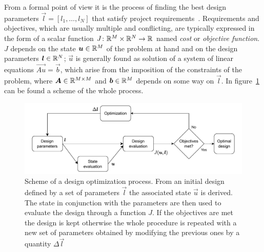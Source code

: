 From a formal point of view it is the process of finding the best design parameters $\vec{l} = [l_1, \dots, l_N]$ that satisfy project requirements~\cite{Matlab:design_opt}. Requirements and objectives, which are usually multiple and conflicting, are typically expressed in the form of a scalar function $J \colon \mathbb{R}^M\times\mathbb{R}^N \to \mathbb{R}$ named \emph{cost} or \emph{objective function}. $J$ depends on the state $\boldsymbol{u} \in \mathbb{R}^M$ of the problem at hand and on the design parameters $\boldsymbol{l} \in \mathbb{R}^N$; $\vec{u}$ is generally found as solution of a system of linear equations $\vec{Au} = \vec{b}$, which arise from the imposition of the constraints of the problem, where $\boldsymbol{A} \in \mathbb{R}^{M \times M}$ and $\boldsymbol{b} \in \mathbb{R}^M$ depends on some way on $\vec{l}$. In figure~\ref{fig:design_opt_scheme} can be found a scheme of the whole process.


\begin{figure}
	\centering
	\includegraphics[width=\textwidth]{img/design_opt_scheme.pdf}
	\caption{Scheme of a design optimization process. From an initial design defined by a set of parameters $\vec{l}$ the associated state $\vec{u}$ is derived. The state in conjunction with the parameters are then used to evaluate the design through a function $J$. If the objectives are met the design is kept otherwise the whole procedure is repeated with a new set of parameters obtained by modifying the previous ones by a quantity $\Delta\vec{l}$} 
	\label{fig:design_opt_scheme}
\end{figure}


